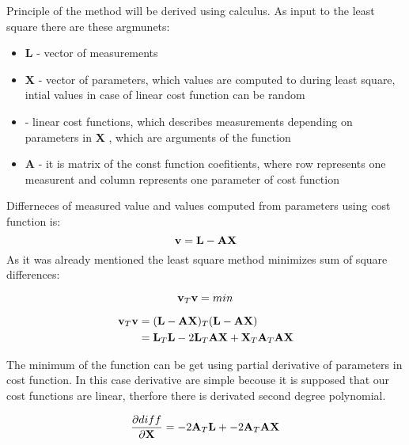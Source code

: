 \documentclass[a4paper,12pt]{report}
\newcommand{\ematr}[1]{
{\bf #1}
}
\newcommand{\evect}[1]{
{\bf #1}
}
\newcommand{\efunc}[1]{
{\it #1}
}
\begin{document}
Principle of the method  will be derived using calculus.
As input to the least square there are these argmunets:
\begin{itemize}
\item \evect{L} - vector of measurements
\item \evect{X} - vector of parameters, which values are computed to during least square, intial values in
		  case of linear cost function can be random
\item   - linear cost functions, which describes measurements depending on parameters in \evect{X},
          which are arguments of the function
\item \ematr{A} - it is matrix of the const function  coefitients,  where row represents one measurent 
		  and column represents one parameter of cost function
\end{itemize}
		  
Differneces of measured value and values computed from parameters using cost function is:
\begin{equation}
\evect{v} = \evect{L} - \ematr{A}\evect{X}
\label{eq:least_v}
\end{equation} 
As it was already mentioned the least square method minimizes sum of square differences:

\begin{equation}
\evect{v}_{T} \evect{v} = min
\end{equation} 

\begin{equation}
\begin{split}
\evect{v}_{T} \evect{v} &= (\evect{L} - \ematr{A}\ematr{X})_{T} (\evect{L} - \ematr{A}\ematr{X}) \\
&= \evect{L}_{T} \evect{L} - 2 \evect{L}_{T} \ematr{A} \evect{X} + \evect{X}_{T} \ematr{A}_{T} \ematr{A} \evect{X}
\label{eq:least_be_part}
\end{split}
\end{equation} 

The minimum of the function can be get using partial derivative of parameters in cost function.
In this case derivative are simple becouse it is supposed that our cost functions are linear,
therfore there is derivated second degree polynomial.
 
\begin{equation}
\frac{\partial diff}{\partial \evect{X}} = -2\ematr{A}_{T} \evect{L} + -2\ematr{A}_{T}\ematr{A} \evect{X} 
\label{eq:least_part}
\end{equation} 
\end{document}
